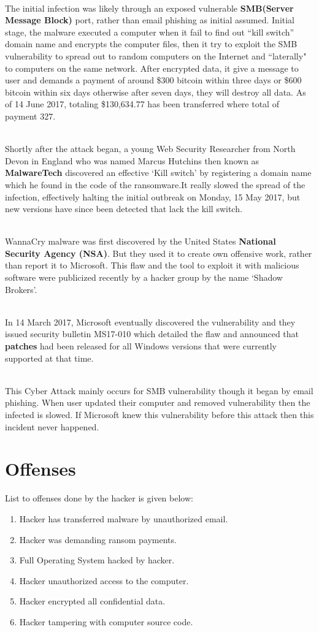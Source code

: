 \documentclass[a4paper,10pt]{article}
\begin{document}
\\
The initial infection was likely through an exposed vulnerable {\bf SMB(Server Message Block)}  port,
rather than email phishing as initial assumed. Initial stage, the malware executed a computer when it
fail to find out ``kill switch” domain name and encrypts the computer files, then it try to exploit the
SMB vulnerability to spread out to random computers on the Internet and ``laterally" to computers on the same network.
After encrypted data, it give a message to user and demands a payment of around \$300 bitcoin within three days or \$600
bitcoin within six days otherwise after seven days, they will destroy all data. As of 14 June 2017,
totaling \$130,634.77 has been transferred where total of payment 327.

\\
Shortly after the attack began, a young Web Security Researcher from North Devon in England who was named 
Marcus Hutchins then known as {\bf MalwareTech} discovered an effective `Kill switch’ by registering a domain
name which he found in the code of the ransomware.It really slowed the spread of the infection, 
effectively halting the initial outbreak on Monday, 15 May 2017, but new versions have since been detected
that lack the kill switch.

\\
WannaCry malware was first discovered by the United States {\bf National Security Agency (NSA)}.
But they used it to create own offensive work, rather than report it to Microsoft. This flaw and
the tool to exploit it with malicious software were publicized recently by a hacker group by the name `Shadow Brokers’.

\\
In 14 March 2017, Microsoft eventually discovered the vulnerability and they issued security bulletin MS17-010 which detailed 
the flaw and announced that {\bf patches} had been released for all Windows versions that were currently supported at that time.

\\
This Cyber Attack mainly occurs for SMB vulnerability though it began by email phishing. When user updated their computer and 
removed vulnerability then the infected is slowed. If Microsoft knew this vulnerability before this attack then this incident
never happened.

\newpage
\section{Offenses}
List to offenses done by the hacker is given below:
\begin{enumerate}
 \item Hacker has transferred malware by unauthorized email.
 \item Hacker was demanding ransom payments.
 \item Full Operating System hacked by hacker.
 \item Hacker unauthorized access to the computer.
 \item Hacker encrypted all confidential data.
 \item Hacker tampering with computer source code.
\end{enumerate}
\end{document}
